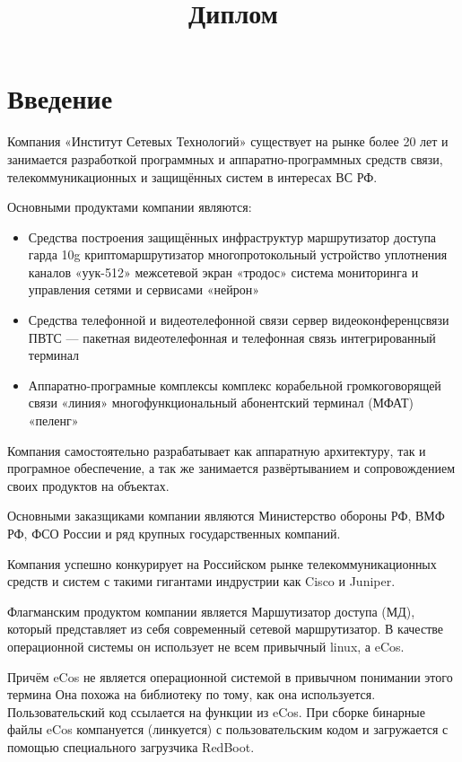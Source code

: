 \documentclass[14pt]{extarticle}
\title{Диплом}
\begin{document}
\maketitle

\pagebreak
\tableofcontents

\pagebreak
\section{Введение}

Компания «Институт Сетевых Технологий» существует на рынке более 20 лет и
занимается разработкой программных и аппаратно-программных средств связи,  телекоммуникационных и защищённых систем в интересах ВС РФ.

Основными продуктами компании являются:
\begin{itemize}
    \item Средства построения защищённых инфраструктур
    \subitem маршрутизатор доступа гарда 10g
    \subitem криптомаршрутизатор многопротокольный
    \subitem устройство уплотнения каналов «уук-512»
    \subitem межсетевой экран «тродос»
    \subitem система мониторинга и управления сетями и сервисами «нейрон»
    \item Средства телефонной и видеотелефонной связи
    \subitem сервер видеоконференцсвязи
    \subitem ПВТС — пакетная видеотелефонная и телефонная связь
    \subitem интегрированный терминал
    \item Аппаратно-програмные комплексы
    \subitem комплекс корабельной громкоговорящей связи «линия»
    \subitem многофункциональный абонентский терминал (МФАТ) «пеленг»
\end{itemize}

Компания самостоятельно разрабатывает  как аппаратную  архитектуру, так и програмное обеспечение, а так же занимается развёртыванием и сопровождением своих продуктов на объектах.

Основными заказщиками компании являются Министерство обороны РФ, ВМФ РФ, ФСО России и ряд крупных государственных компаний.

Компания успешно конкурирует на Российском рынке телекоммуникационных средств и систем с такими гигантами индрустрии как Cisco и Juniper.

Флагманским продуктом компании является Маршутизатор доступа (МД), который представляет из себя современный сетевой маршрутизатор. В качестве операционной системы он использует не всем привычный linux, а eCos.

Причём eCos не является операционной системой в привычном понимании этого термина Она похожа на библиотеку по тому, как она используется. Пользовательский код ссылается на функции из eCos. При сборке бинарные файлы eCos компануется (линкуется) с пользовательским кодом и загружается с помощью специального загрузчика RedBoot.
\end{document}
